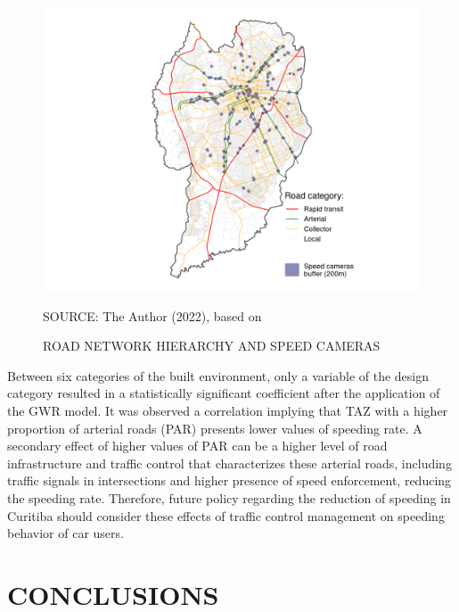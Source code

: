 \begin{figure}[!htbp]
    \footnotesize
    \captionsetup{font=footnotesize}
    \caption{ROAD NETWORK HIERARCHY AND SPEED CAMERAS}
    \centering
    \includegraphics{fig/cam_buffer_plot.png}
    \label{fig:cam_buffer}
    \par SOURCE: The Author (2022), based on \textcite{IPPUC2021, SETRAN2020}
\end{figure}



Between six categories of the built environment, only a variable of the design category resulted in a statistically significant coefficient after the application of the GWR model. It was observed a correlation implying that TAZ with a higher proportion of arterial roads (PAR) presents lower values of speeding rate. A secondary effect of higher values of PAR can be a higher level of road infrastructure and traffic control that characterizes these arterial roads, including traffic signals in intersections and higher presence of speed enforcement, reducing the speeding rate. Therefore, future policy regarding the reduction of speeding in Curitiba should consider these effects of traffic control management on speeding behavior of car users. 


\chapter{CONCLUSIONS} \label{cap:conclusion}

